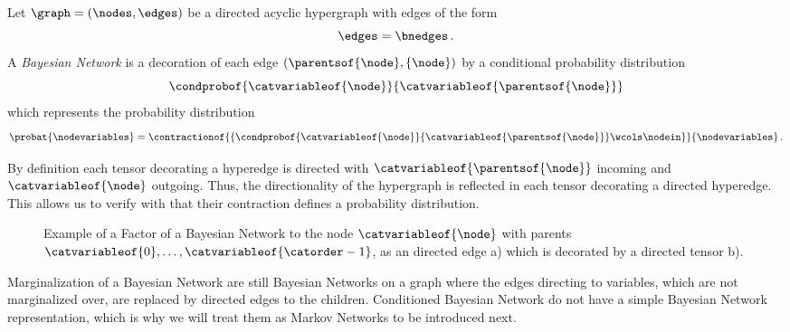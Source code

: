 \begin{definition}
    \label{def:bayesianNetwork}
    Let $\graph=(\nodes,\edges)$ be a directed acyclic hypergraph with edges of the form
    \[ \edges = \bnedges \, . \]
    A \emph{Bayesian Network} is a decoration of each edge $(\parentsof{\node},\{\node\})$ by a conditional probability distribution
    \[ \condprobof{\catvariableof{\node}}{\catvariableof{\parentsof{\node}}} \]
    which represents the probability distribution
    \begin{align*}
        \probat{\nodevariables} = \contractionof{\{\condprobof{\catvariableof{\node}}{\catvariableof{\parentsof{\node}}} \wcols\nodein\}}{\nodevariables} \, .
    \end{align*}
\end{definition}

By definition each tensor decorating a hyperedge is directed with $\catvariableof{\parentsof{\node}}$ incoming and $\catvariableof{\node}$ outgoing.
Thus, the directionality of the hypergraph is reflected in each tensor decorating a directed hyperedge.
This allows us to verify with  that their contraction defines a probability distribution.


\begin{figure}[t]
    \begin{center}
        
    \end{center}
    \caption{Example of a Factor of a Bayesian Network to the node $\catvariableof{\node}$ with parents $\catvariableof{0},\ldots,\catvariableof{\catorder-1}$, as an directed edge a) which is decorated by a directed tensor b).}
    \label{fig:BayesianFactor}
\end{figure}


Marginalization of a Bayesian Network are still Bayesian Networks on a graph where the edges directing to variables, which are not marginalized over, are replaced by directed edges to the children.
Conditioned Bayesian Network do not have a simple Bayesian Network representation, which is why we will treat them as Markov Networks to be introduced next.


